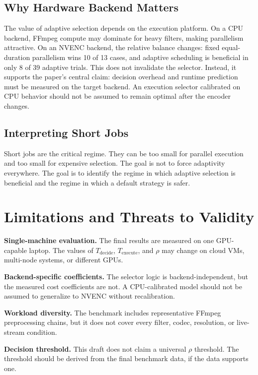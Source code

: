 \documentclass[conference]{IEEEtran}
\newcommand{\BeneficialCount}{8}
\begin{document}
\subsection{Why Hardware Backend Matters}

The value of adaptive selection depends on the execution platform.
On a CPU backend, FFmpeg compute may dominate for heavy filters, making parallelism attractive.
On an NVENC backend, the relative balance changes: fixed equal-duration parallelism wins 10 of 13 cases, and adaptive scheduling is beneficial in only \BeneficialCount{} of 39 adaptive trials.
This does not invalidate the selector.
Instead, it supports the paper's central claim: decision overhead and runtime prediction must be measured on the target backend.
An execution selector calibrated on CPU behavior should not be assumed to remain optimal after the encoder changes.

\subsection{Interpreting Short Jobs}

Short jobs are the critical regime.
They can be too small for parallel execution and too small for expensive selection.
The goal is not to force adaptivity everywhere.
The goal is to identify the regime in which adaptive selection is beneficial and the regime in which a default strategy is safer.

\section{Limitations and Threats to Validity}

\textbf{Single-machine evaluation.}
The final results are measured on one GPU-capable laptop.
The values of $T_{\mathrm{decide}}$, $T_{\mathrm{execute}}$, and $\rho$ may change on cloud VMs, multi-node systems, or different GPUs.

\textbf{Backend-specific coefficients.}
The selector logic is backend-independent, but the measured cost coefficients are not.
A CPU-calibrated model should not be assumed to generalize to NVENC without recalibration.

\textbf{Workload diversity.}
The benchmark includes representative FFmpeg preprocessing chains, but it does not cover every filter, codec, resolution, or live-stream condition.

\textbf{Decision threshold.}
This draft does not claim a universal $\rho$ threshold.
The threshold should be derived from the final benchmark data, if the data supports one.
\end{document}
